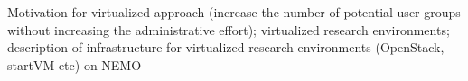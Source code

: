 Motivation for virtualized approach (increase the number of potential
user groups without increasing the administrative effort); virtualized
research environments; description of infrastructure for virtualized research environments
(OpenStack, startVM etc) on NEMO 

